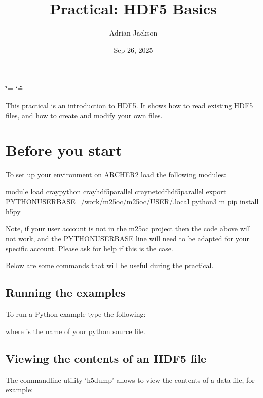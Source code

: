 \documentclass[letterpaper,10pt,english]{sphinxmanual}
\title{Practical: HDF5 Basics}
\date{Sep 26, 2025}
\author{Adrian Jackson}
\begin{document}
\ifdefined\shorthandoff
  \ifnum\catcode`\=\string=\active\shorthandoff{=}\fi
  \ifnum\catcode`\"=\active{}\fi
\fi

\pagestyle{empty}
\sphinxmaketitle
\pagestyle{plain}
\sphinxtableofcontents
\pagestyle{normal}
\label{\detokenize{index::doc}}


\sphinxAtStartPar
This practical is an introduction to HDF5. It shows how to read existing HDF5 files, and how to create and modify your own files.


\chapter{Before you start}
\label{\detokenize{index:before-you-start}}
\sphinxAtStartPar
To set up your environment on ARCHER2 load the following modules:

\begin{sphinxVerbatim}[commandchars=\\\{\}]
module load cray\PYGZhy{}python cray\PYGZhy{}hdf5\PYGZhy{}parallel cray\PYGZhy{}netcdf\PYGZhy{}hdf5parallel
export PYTHONUSERBASE=/work/m25oc/m25oc/\PYGZdl{}USER/.local
python3 \PYGZhy{}m pip install h5py
\end{sphinxVerbatim}

\sphinxAtStartPar
Note, if your user account is not in the m25oc project then the code above will not work, and the PYTHONUSERBASE line will need to be adapted for your specific account. Please ask for help if this is the case.

\sphinxAtStartPar
Below are some commands that will be useful during the practical.


\section{Running the examples}
\label{\detokenize{index:running-the-examples}}
\sphinxAtStartPar
To run a Python example type the following:

\begin{sphinxVerbatim}[commandchars=\\\{\}]
 
\end{sphinxVerbatim}

\sphinxAtStartPar
where  is the name of your python source file.


\section{Viewing the contents of an HDF5 file}
\label{\detokenize{index:viewing-the-contents-of-an-hdf5-file}}
\sphinxAtStartPar
The commandline utility ‘h5dump’ allows to view the contents of a data file, for example:
\end{document}
